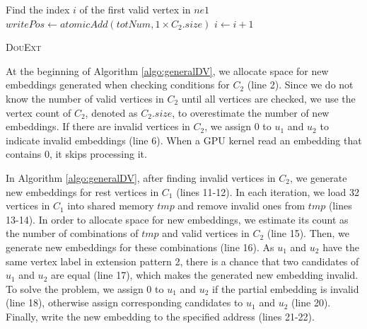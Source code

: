 \begin{algorithm}
	Find the index $i$ of the first valid vertex in $ne1$\;
	$writePos \leftarrow atomicAdd(totNum,1 \times C_{2}.size)$\;
	$i \leftarrow i+1$\;
	\caption{\textsc{DouExt}}
	\label{algo:generalDV}
\end{algorithm}

At the beginning of Algorithm \ref{algo:generalDV}, we allocate space for new embeddings generated when checking conditions for $C_2$ (line 2). Since we do not know the number of valid vertices in $C_2$ until all vertices are checked, we use the vertex count of $C_2$, denoted as $C_{2}.size$, to overestimate the number of new embeddings. If there are invalid vertices in $C_2$, we assign 0 to $u_1$ and $u_2$ to indicate invalid embeddings (line 6). When a GPU kernel read an embedding that contains 0, it skips processing it.

In Algorithm \ref{algo:generalDV}, after finding invalid vertices in $C_2$, we generate new embeddings for rest vertices in $C_1$ (lines 11-12). In each iteration, we load 32 vertices in $C_1$ into shared memory $tmp$ and remove invalid ones from $tmp$ (lines 13-14). In order to allocate space for new embeddings, we estimate its count as the number of combinations of $tmp$ and valid vertices in $C_2$ (line 15). Then, we generate new embeddings for these combinations (line 16). As $u_1$ and $u_2$ have the same vertex label in extension pattern 2, there is a chance that two candidates of $u_1$ and $u_2$ are equal (line 17), which makes the generated new embedding invalid. To solve the problem, we assign 0 to $u_1$ and $u_2$ if the partial embedding is invalid (line 18), otherwise assign corresponding candidates to $u_1$ and $u_2$ (line 20). Finally, write the new embedding to the specified address (lines 21-22).


